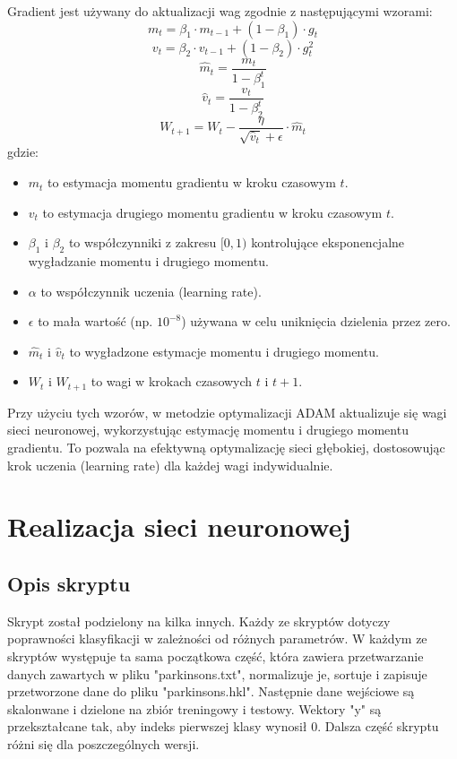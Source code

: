 \documentclass{article}
\begin{document}
Gradient jest używany do aktualizacji wag zgodnie z następującymi wzorami:
\[m_t = \beta_1 \cdot m_{t-1} + (1 - \beta_1) \cdot g_t\]
\[v_t = \beta_2 \cdot v_{t-1} + (1 - \beta_2) \cdot g_t^2\]
\[\hat{m}_t = \frac{m_t}{1 - \beta_1^t}\]
\[\hat{v}_t = \frac{v_t}{1 - \beta_2^t}\]
\[ W_{t+1} = W_t - \frac{\eta}{\sqrt{\hat{v}_t} + \epsilon} \cdot \hat{m}_t \]
gdzie:
\begin{itemize}
    \item \(m_t\) to estymacja momentu gradientu w kroku czasowym \(t\).
    \item \(v_t\) to estymacja drugiego momentu gradientu w kroku czasowym \(t\).
    \item \(\beta_1\) i \(\beta_2\) to współczynniki z zakresu \([0, 1)\) kontrolujące eksponencjalne wygładzanie momentu i drugiego momentu.
    \item \(\alpha\) to współczynnik uczenia (learning rate).
    \item \(\epsilon\) to mała wartość (np. \(10^{-8}\)) używana w celu uniknięcia dzielenia przez zero.
    \item \(\hat{m}_t\) i \(\hat{v}_t\) to wygładzone estymacje momentu i drugiego momentu.
    \item \(W_{t}\) i \(W_{t+1}\) to wagi w krokach czasowych \(t\) i \(t+1\).
\end{itemize}
Przy użyciu tych wzorów, w metodzie optymalizacji ADAM aktualizuje się wagi sieci neuronowej, wykorzystując estymację momentu i drugiego momentu gradientu.
To pozwala na efektywną optymalizację sieci głębokiej, dostosowując krok uczenia (learning rate) dla każdej wagi indywidualnie.
\section{Realizacja sieci neuronowej}
\subsection{Opis skryptu}
Skrypt został podzielony na kilka innych.
Każdy ze skryptów dotyczy poprawności klasyfikacji w zależności od różnych parametrów.
W każdym ze skryptów występuje ta sama początkowa część, która zawiera przetwarzanie danych zawartych w pliku "parkinsons.txt", normalizuje je, sortuje i zapisuje przetworzone dane do pliku "parkinsons.hkl".
Następnie dane wejściowe są skalonwane i dzielone na zbiór treningowy i testowy.
Wektory "y" są przekształcane tak, aby indeks pierwszej klasy wynosił 0.
Dalsza część skryptu różni się dla poszczególnych wersji.
\end{document}
